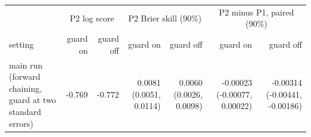 \begin{tabular}{lrrrrrr}
\toprule
& \multicolumn{2}{c}{P2 log score} & \multicolumn{2}{c}{P2 Brier skill (90\%)} & \multicolumn{2}{c}{P2 minus P1, paired (90\%)} \\
setting & guard on & guard off & guard on & guard off & guard on & guard off \\
\midrule
main run (forward chaining, guard at two standard errors) & -0.769 & -0.772 & 0.0081 (0.0051, 0.0114) & 0.0060 (0.0026, 0.0098) & -0.00023 (-0.00077, 0.00022) & -0.00314 (-0.00441, -0.00186) \\

\end{tabular}
